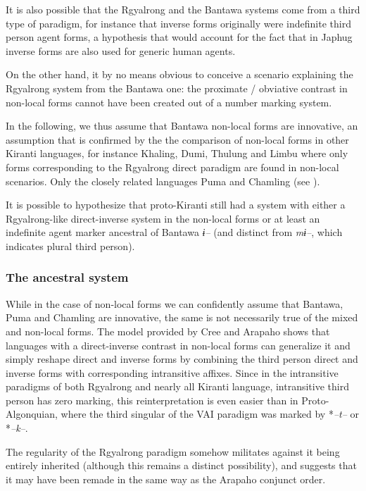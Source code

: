 \documentclass[twoside,a4paper,11pt]{article}
\newcommand{\ipa}[1]{{\phon\textit{#1}}}
\newcommand{\Σ}{\greek{Σ}}
\begin{document}
It is also possible that the Rgyalrong and the Bantawa systems come from a third type of paradigm, for instance that inverse forms originally were indefinite third person agent forms, a hypothesis that would account for the fact that in Japhug inverse forms are also used for generic human agents. 

On the other hand, it by no means obvious to conceive a scenario explaining the Rgyalrong system from the Bantawa one: the proximate / obviative contrast in non-local forms cannot have been created out of a   number marking system. 
 
In the following, we thus assume that Bantawa non-local forms are innovative, an assumption that is confirmed by the the comparison of non-local forms in other Kiranti languages, for instance Khaling, Dumi, Thulung and  Limbu where only  forms corresponding to the Rgyalrong direct paradigm are found in non-local scenarios. Only the closely related languages Puma  and Chamling (see \citealt{bickel07puma}).

It is possible to hypothesize that proto-Kiranti still had a system with either a Rgyalrong-like direct-inverse system in the non-local forms or at least an indefinite agent marker ancestral of Bantawa \ipa{ɨ--} (and distinct from \ipa{mɨ--}, which indicates plural third person).

\subsubsection{The ancestral system}
While in the case of non-local forms we can confidently assume that Bantawa, Puma and Chamling are innovative, the same is not necessarily true of the mixed and non-local forms. The model provided by Cree and Arapaho shows that languages with a direct-inverse contrast in non-local forms can generalize it and simply reshape direct and inverse forms by combining the third person direct and inverse forms with corresponding intransitive affixes. Since in the intransitive paradigms of both Rgyalrong and nearly all Kiranti language, intransitive third person has zero marking, this reinterpretation is even easier than in Proto-Algonquian, where the third singular of the VAI paradigm was marked by *\ipa{--t--} or *\ipa{--k--}.

The regularity of the Rgyalrong paradigm somehow militates against it being entirely inherited (although this remains a distinct possibility), and suggests that it may have been remade in the same way as the Arapaho conjunct order. 
\end{document}
